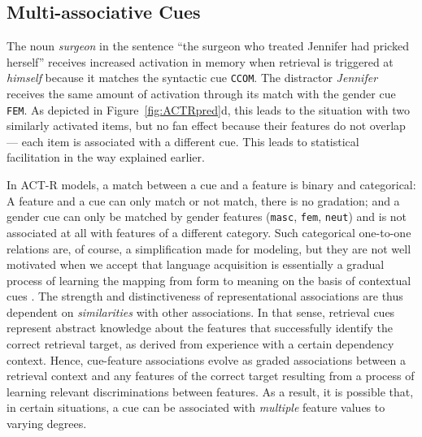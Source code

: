 \documentclass{cambridge7A}\usepackage[]{graphicx}\usepackage[]{color}
\newcommand{\actrcue}[1]{\texttt{\uppercase{#1}}}
\newcommand{\revFE}[1]{#1}
\begin{document}
\subsection{Multi-associative Cues}
\label{sec:cueconf}
\revFE{
The noun \textit{surgeon} in the sentence ``the surgeon who treated Jennifer had pricked herself'' receives increased activation in memory when retrieval is triggered at \textit{himself} because it matches the syntactic cue \actrcue{CCOM}.
The distractor \textit{Jennifer} receives the same amount of activation through its match with the gender cue \actrcue{FEM}. As depicted in Figure~\ref{fig:ACTRpred}d, this leads to the situation with two similarly activated items, but no fan effect because their features do not overlap --- each item is associated with a different cue.
This leads to statistical facilitation in the way explained earlier.

In ACT-R models, a match between a cue and a feature is \index{binary match} binary and \index{categorical match} categorical: A feature and a cue can only match or not match, there is no gradation; and a gender cue can only be matched by gender features (\texttt{masc}, \texttt{fem}, \texttt{neut}) and is not associated at all with features of a different category.
Such categorical one-to-one relations are, of course, a simplification made for modeling, but they are not well motivated when we accept that language acquisition is essentially a gradual process of learning the mapping from form to meaning on the basis of contextual cues \citep[see, e.g.,][]{bybee2006usage,langacker1987foundations,tomasello2003constructing}. The strength and distinctiveness of representational associations are thus dependent on \emph{similarities} with other associations.
In that sense, retrieval cues represent abstract knowledge about the features that successfully identify the correct retrieval target, as derived from experience with a certain dependency context. Hence, cue-feature associations evolve as graded associations between a retrieval context and any features of the correct target resulting from a process of learning relevant discriminations between features. 
As a result, it is possible that, in certain situations, a cue can be associated with \emph{multiple} feature values to varying degrees. 

}
\end{document}
